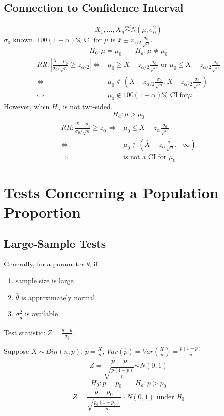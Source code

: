 \subsection{Connection to Confidence Interval}
\[X_1,\dots,X_n \overset{iid}{\sim} N(\mu,\sigma_0^2)\]
$\sigma_0$ known. $100(1-\alpha)\%$ CI for $\mu$ is $\bar{x} \pm  z_{\alpha/2} \frac{\sigma_0}{\sqrt{n}} $.
\[H_0:\mu=\mu_0 \qquad H_a:\mu\neq\mu_0\]
\begin{align*}
RR:\left| \frac{\bar{X}-\mu_0}{\sigma_0/\sqrt{n}}\geq z_{\alpha/2} \right| \Leftrightarrow & \mu_0\geq \bar{X}+ z_{\alpha/2} \frac{\sigma_0}{\sqrt{n}} \text{ or } \mu_0\leq \bar{X}- z_{\alpha/2} \frac{\sigma_0}{\sqrt{n}} \\
\Leftrightarrow & \mu_0 \notin \left(\bar{X}-  z_{\alpha/2} \frac{\sigma_0}{\sqrt{n}},\bar{X}+ z_{\alpha/2} \frac{\sigma_0}{\sqrt{n}}\right) \\
\Leftrightarrow & \mu_0 \notin 100(1-\alpha)\% \text{ CI for} \mu
\end{align*}
However, when $H_a$ is not two-sided.
\[ H_a:\mu>\mu_0\]
\begin{align*}
RR: \frac{\bar{X}-\mu_0}{\sigma_0/\sqrt{n}}\geq z_{\alpha} \Leftrightarrow &  \mu_0\leq \bar{X}- z_{\alpha} \frac{\sigma_0}{\sqrt{n}} \\
\Leftrightarrow &  \mu_0 \notin \left(\bar{X}- z_{\alpha} \frac{\sigma_0}{\sqrt{n}},+\infty \right) \\
\Rightarrow & \text{is not a CI for }\mu_0 
\end{align*}

\section{Tests Concerning a Population Proportion}
\subsection{Large-Sample Tests}

Generally, for a parameter $\theta$, if
\begin{enumerate}
\item sample size is large
\item $\hat{\theta}$ is approximately normal
\item $\sigma_{\hat{\theta}}^2$ is available
\end{enumerate}

Test statistic: $Z=\frac{\hat{\theta}-\theta}{\sigma_{\hat{\theta}}}$.

Suppose $X\sim Bin(n,p)$, $\hat{p}=\frac{X}{n}$, $Var(\hat{p})=Var\left(\frac{X}{n}\right)=\frac{p(1-p)}{n}$
\[Z=\frac{\hat{p}-p}{\sqrt{\frac{p(1-p)}{n}}} \overset{\cdot}{\sim}N(0,1)\]
\[H_0:p=p_0 \qquad H_a:p>p_0\]
\[Z=\frac{\hat{p}-p_0}{\sqrt{\frac{p_0(1-p_0)}{n}}} \overset{\cdot}{\sim}N(0,1) \text{ under }H_0\]

